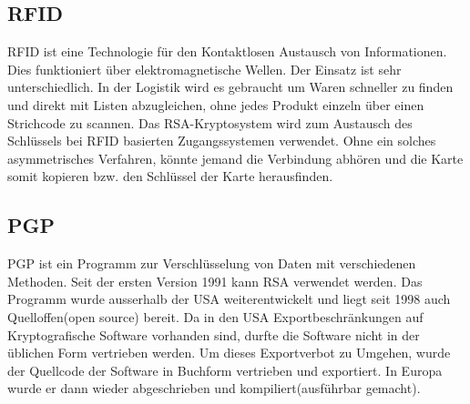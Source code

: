 \subsection{RFID}
RFID ist eine Technologie für den Kontaktlosen Austausch von Informationen. Dies funktioniert über elektromagnetische Wellen. Der Einsatz ist sehr unterschiedlich. In der Logistik wird es gebraucht um Waren schneller zu finden und direkt mit Listen abzugleichen, ohne jedes Produkt einzeln über einen Strichcode zu scannen. Das RSA-Kryptosystem wird zum Austausch des Schlüssels bei RFID basierten Zugangssystemen verwendet. Ohne ein solches asymmetrisches Verfahren, könnte jemand die Verbindung abhören und die Karte somit kopieren bzw. den Schlüssel der Karte herausfinden.

\subsection{PGP}
PGP ist ein Programm zur Verschlüsselung von Daten mit verschiedenen Methoden. Seit der ersten Version 1991 kann RSA verwendet werden. Das Programm wurde ausserhalb der USA weiterentwickelt und liegt seit 1998 auch Quelloffen(open source) bereit. Da in den USA Exportbeschränkungen auf Kryptografische Software vorhanden sind, durfte die Software nicht in der üblichen Form vertrieben werden. Um dieses Exportverbot zu Umgehen, wurde der Quellcode der Software in Buchform vertrieben und exportiert. In Europa wurde er dann wieder abgeschrieben und kompiliert(ausführbar gemacht). 


